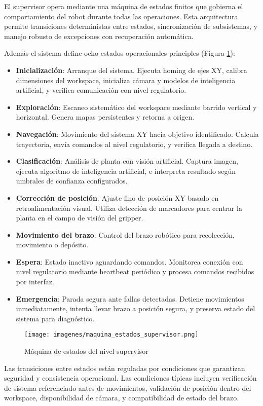 El supervisor opera mediante una máquina de estados finitos que gobierna el comportamiento del robot durante todas las operaciones. Esta arquitectura permite transiciones deterministas entre estados, sincronización de subsistemas, y manejo robusto de excepciones con recuperación automática.

Además el sistema define ocho estados operacionales principles (Figura \ref{fig:maquina_estados_supervisor}):

\begin{itemize}
    \item \textbf{Inicialización}: Arranque del sistema. Ejecuta homing de ejes XY, calibra dimensiones del workspace, inicializa cámara y modelos de inteligencia artificial, y verifica comunicación con nivel regulatorio.

    \item \textbf{Exploración}: Escaneo sistemático del workspace mediante barrido vertical y horizontal. Genera mapas persistentes y retorna a origen.

    \item \textbf{Navegación}: Movimiento del sistema XY hacia objetivo identificado. Calcula trayectoria, envía comandos al nivel regulatorio, y verifica llegada a destino.

    \item \textbf{Clasificación}: Análisis de planta con visión artificial. Captura imagen, ejecuta algoritmo de inteligencia artificial, e interpreta resultado según umbrales de confianza configurados.
    
    \item \textbf{Corrección de posición}: Ajuste fino de posición XY basado en retroalimentación visual. Utiliza detección de marcadores para centrar la planta en el campo de visión del gripper.  

    \item \textbf{Movimiento del brazo}: Control del brazo robótico para recolección, movimiento o depósito. 

    \item \textbf{Espera}: Estado inactivo aguardando comandos. Monitorea conexión con nivel regulatorio mediante heartbeat periódico y procesa comandos recibidos por interfaz.

    \item \textbf{Emergencia}: Parada segura ante fallas detectadas. Detiene movimientos inmediatamente, intenta llevar brazo a posición segura, y preserva estado del sistema para diagnóstico.
\end{itemize}

\begin{figure}[H]
    \centering
    \texttt{[image: imagenes/maquina\_estados\_supervisor.png]}
    \caption{Máquina de estados del nivel supervisor}
    \label{fig:maquina_estados_supervisor}
\end{figure}

Las transiciones entre estados están reguladas por condiciones que garantizan seguridad y consistencia operacional. Las condiciones típicas incluyen verificación de sistema referenciado antes de movimientos, validación de posición dentro del workspace, disponibilidad de cámara, y compatibilidad de estado del brazo.